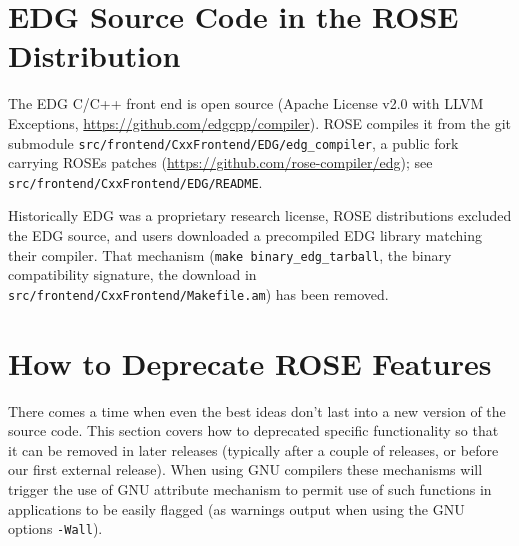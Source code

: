
\section{EDG Source Code in the ROSE Distribution}%

   The EDG C/C++ front end is open source (Apache License v2.0 with LLVM Exceptions,
\url{https://github.com/edgcpp/compiler}). ROSE compiles it from the git submodule
{\tt src/frontend/CxxFrontend/EDG/edg\_compiler}, a public fork carrying ROSE\textquotesingle s patches
(\url{https://github.com/rose-compiler/edg}); see {\tt src/frontend/CxxFrontend/EDG/README}.

   Historically EDG was a proprietary research license, ROSE distributions excluded the EDG source,
   and users downloaded a precompiled EDG library matching their compiler. That mechanism
   ({\tt make binary\_edg\_tarball}, the binary compatibility signature, the download in
   {\tt src/frontend/CxxFrontend/Makefile.am}) has been removed.

\section{How to Deprecate ROSE Features}%

    There comes a time when even the best ideas don't last
into a new version of the source code.  This section covers how to
deprecated specific functionality so that it can be removed in
later releases (typically after a couple of releases, or before
our first external release).  When using GNU compilers these mechanisms
will trigger the use of GNU attribute mechanism to permit use of such
functions in applications to be easily flagged (as warnings
output when using the GNU options {\tt -Wall}).

